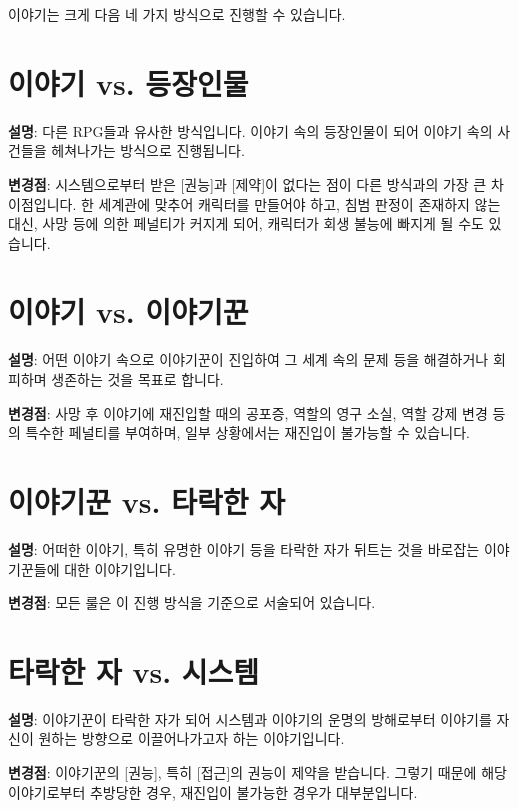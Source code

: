 \documentclass[12pt]{report}
\begin{document}
	\bigskip
	
	이야기는 크게 다음 네 가지 방식으로 진행할 수 있습니다.
	
	\section*{이야기 vs. 등장인물}
	\textbf{설명}: 다른 RPG들과 유사한 방식입니다. 이야기 속의 등장인물이 되어 이야기 속의 사건들을 헤쳐나가는 방식으로 진행됩니다.
	
	\textbf{변경점}: 시스템으로부터 받은 [권능]과 [제약]이 없다는 점이 다른 방식과의 가장 큰 차이점입니다. 한 세계관에 맞추어 캐릭터를 만들어야 하고, 침범 판정이 존재하지 않는 대신, 사망 등에 의한 페널티가 커지게 되어, 캐릭터가 회생 불능에 빠지게 될 수도 있습니다.
	
	\section*{이야기 vs. 이야기꾼}
	\textbf{설명}: 어떤 이야기 속으로 이야기꾼이 진입하여 그 세계 속의 문제 등을 해결하거나 회피하며 생존하는 것을 목표로 합니다.
	
	\textbf{변경점}: 사망 후 이야기에 재진입할 때의 공포증, 역할의 영구 소실, 역할 강제 변경 등의 특수한 페널티를 부여하며, 일부 상황에서는 재진입이 불가능할 수 있습니다.
	
	\section*{이야기꾼 vs. 타락한 자}
	\textbf{설명}: 어떠한 이야기, 특히 유명한 이야기 등을 타락한 자가 뒤트는 것을 바로잡는 이야기꾼들에 대한 이야기입니다.
	
	\textbf{변경점}: 모든 룰은 이 진행 방식을 기준으로 서술되어 있습니다.
	
	\section*{타락한 자 vs. 시스템}
	\textbf{설명}: 이야기꾼이 타락한 자가 되어 시스템과 이야기의 운명의 방해로부터 이야기를 자신이 원하는 방향으로 이끌어나가고자 하는 이야기입니다.
	
	\textbf{변경점}: 이야기꾼의 [권능], 특히 [접근]의 권능이 제약을 받습니다. 그렇기 때문에 해당 이야기로부터 추방당한 경우, 재진입이 불가능한 경우가 대부분입니다.
	
	\bigskip
	
\end{document}
